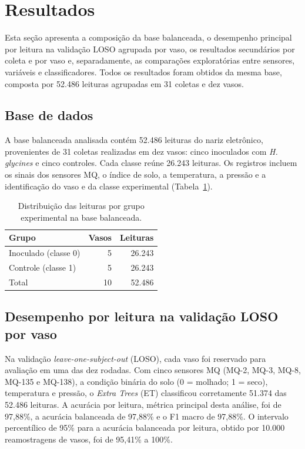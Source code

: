 \section{Resultados}
\label{results}

Esta seção apresenta a composição da base balanceada, o desempenho principal por leitura na validação LOSO agrupada por vaso, os resultados secundários por coleta e por vaso e, separadamente, as comparações exploratórias entre sensores, variáveis e classificadores. Todos os resultados foram obtidos da mesma base, composta por 52.486 leituras agrupadas em 31 coletas e dez vasos.

\subsection{Base de dados}
\label{subsec:res_base}

A base balanceada analisada contém 52.486 leituras do nariz eletrônico, provenientes de 31 coletas realizadas em dez vasos: cinco inoculados com \textit{H. glycines} e cinco controles. Cada classe reúne 26.243 leituras. Os registros incluem os sinais dos sensores MQ, o índice de solo, a temperatura, a pressão e a identificação do vaso e da classe experimental (Tabela~\ref{tab:base_dados}).

\begin{table}[H]
\centering
\footnotesize
\caption{Distribuição das leituras por grupo experimental na base balanceada.}
\label{tab:base_dados}
\begin{tabular}{lrr}
\toprule
Grupo & Vasos & Leituras \\
\midrule
Inoculado (classe 0) & 5 & 26.243 \\
Controle (classe 1) & 5 & 26.243 \\
\midrule
Total & 10 & 52.486 \\
\bottomrule
\end{tabular}
\end{table}

\subsection{Desempenho por leitura na validação LOSO por vaso}
\label{subsec:res_loso}

Na validação \textit{leave-one-subject-out} (LOSO), cada vaso foi reservado para avaliação em uma das dez rodadas. Com cinco sensores MQ (MQ-2, MQ-3, MQ-8, MQ-135 e MQ-138), a condição binária do solo (0 = molhado; 1 = seco), temperatura e pressão, o \textit{Extra Trees} (ET) classificou corretamente 51.374 das 52.486 leituras. A acurácia por leitura, métrica principal desta análise, foi de 97,88\%, a acurácia balanceada de 97,88\% e o F1 macro de 97,88\%. O intervalo percentílico de 95\% para a acurácia balanceada por leitura, obtido por 10.000 reamostragens de vasos, foi de 95,41\% a 100\%.

